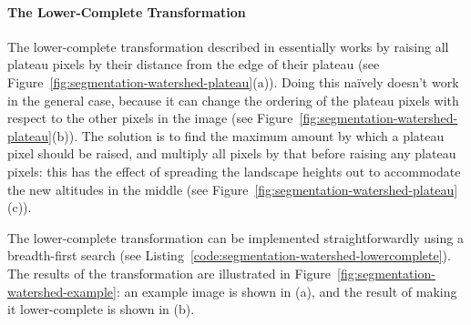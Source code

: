 
\paragraph{The Lower-Complete Transformation}

The lower-complete transformation described in \cite{meijster98} essentially works by raising all plateau pixels by their distance from the edge of their plateau (see Figure~\ref{fig:segmentation-watershed-plateau}(a)). Doing this na\"ively doesn't work in the general case, because it can change the ordering of the plateau pixels with respect to the other pixels in the image (see Figure~\ref{fig:segmentation-watershed-plateau}(b)). The solution is to find the maximum amount by which a plateau pixel should be raised, and multiply all pixels by that before raising any plateau pixels: this has the effect of spreading the landscape heights out to accommodate the new altitudes in the middle (see Figure~\ref{fig:segmentation-watershed-plateau}(c)).

The lower-complete transformation can be implemented straightforwardly using a breadth-first search (see Listing~\ref{code:segmentation-watershed-lowercomplete}). The results of the transformation are illustrated in Figure~\ref{fig:segmentation-watershed-example}: an example image is shown in (a), and the result of making it lower-complete is shown in (b).


